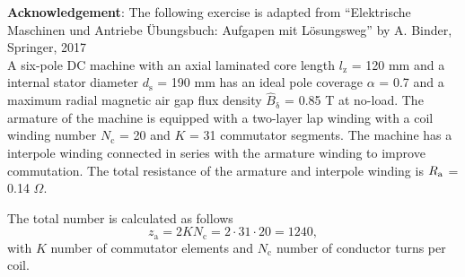 

\normalsize{\textbf{Acknowledgement}: The following exercise is adapted from ``Elektrische Maschinen und Antriebe Übungsbuch: Aufgapen mit Lösungsweg'' by A. Binder, Springer, 2017}\\




A six-pole DC machine with an axial laminated core length $l_{\mathrm{z}}$ = 120 mm and a internal stator diameter $d_{\mathrm{s}}$ = 190 mm has an ideal pole coverage $\alpha$ = 0.7 and a maximum radial magnetic air gap flux density $\hat{B}_{\updelta}$ = 0.85 T at no-load. The armature of the machine is equipped with a two-layer lap winding with a coil winding number $N_{\mathrm{c}}$ = 20 and $K$ = 31 commutator segments.
The machine has a interpole winding connected in series with the armature winding to improve commutation. The total resistance of the armature and interpole winding is $R_{\mathrm{a}}$ = 0.14 $\Omega$.



\begin{solutionblock}
    The total number is calculated as follows
    \begin{equation}
        z_{\mathrm{a}} = 2 K N_{\mathrm{c}}
        = 2 \cdot 31 \cdot 20
        = 1240,
    \end{equation}
    with $K$ number of commutator elements and $N_{\mathrm{c}}$ number of conductor turns per coil.

\end{solutionblock}



